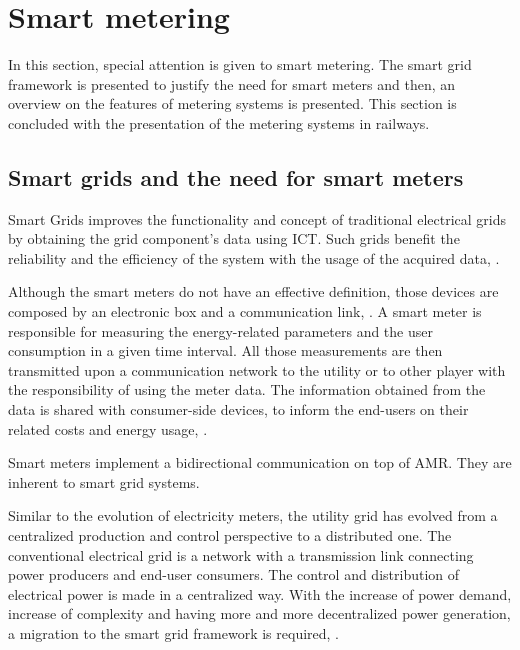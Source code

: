 


\section{Smart metering}

In this section, special attention is given to smart metering. The smart grid framework is presented to justify the need for smart meters and then, an overview on the features of metering systems is presented.
This section is concluded with the presentation of the metering systems in railways.






\subsection{Smart grids and the need for smart meters}

Smart Grids improves the functionality and concept of traditional electrical grids by obtaining the grid component's data using \ac{ICT}. Such grids benefit the reliability and the efficiency of the system with the usage of the acquired data, \cite{Mohassel2014}.

Although the smart meters do not have an effective definition, those devices are composed by an electronic box and a communication link, \cite{Seppo2012}. A smart meter is responsible for measuring the energy-related parameters and the user consumption in a given time interval. All those measurements are then transmitted upon a communication network to the utility or to other player with the responsibility of using the meter data. The information obtained from the data is shared with consumer-side devices, to inform the end-users on their related costs and energy usage, \cite{Siano2014}.

Smart meters implement a bidirectional communication on top of \ac{AMR}. They are inherent to smart grid systems. 

Similar to the evolution of electricity meters, the utility grid has evolved from a centralized production and control perspective to a distributed one. The conventional electrical grid is a network with a transmission link connecting power producers and end-user consumers. The control and distribution of electrical power is made in a centralized way. With the increase of power demand, increase of complexity and having more and more decentralized power generation, a migration to the smart grid framework is required, \cite{Reddy2014}.

